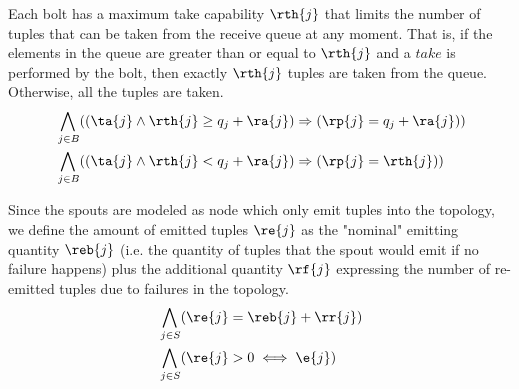 Each bolt has a maximum take capability $\rth{j}$ that limits the number of tuples that can be taken from the receive queue at any moment. That is, if the elements in the queue are greater than or equal to $\rth{j}$ and a $take$ is performed by the bolt, then exactly $\rth{j}$ tuples are taken from the queue. Otherwise, all the tuples are taken. 
\begin{align*}
%
%
& \bigwedge_{
\begin{subarray}{c}
\,j \in B
\end{subarray}
}((\ta{j} \land \rth{j} \geq q_j + \ra{j}) \Rightarrow (\rp{j} = q_j + \ra{j})) \\
%
%
%
%
& \bigwedge_{
\begin{subarray}{c}
\,j \in B
\end{subarray}
}((\ta{j} \land \rth{j} < q_j + \ra{j}) \Rightarrow (\rp{j} = \rth{j}))
%
%
\end{align*}

Since the spouts are modeled as node which only emit tuples into the topology, we define the amount of emitted tuples $\re{j}$ as the "nominal" emitting quantity $\reb{j}$ (i.e. the quantity of tuples that the spout would emit if no failure happens) plus the additional quantity $\rf{j}$ expressing the number of re-emitted tuples due to failures in the topology.
\begin{align*}
%
& \bigwedge_{
\begin{subarray}{c}
\,j \in S\\
\end{subarray}
} ( \re{j} = \reb{j} + \rr{j}) \\
%
%
& \bigwedge_{
\begin{subarray}{c}
\,j \in S\\
\end{subarray}
} ( \re{j} > 0 \iff \e{j}) \\
%
%
\end{align*}






